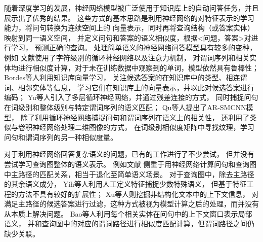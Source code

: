 随着深度学习的发展，神经网络模型被广泛使用于知识库上的自动问答任务，并且展示出了优秀的结果。
这些方式的基本思路是利用神经网络的对特征表示的学习能力，将问句转换为连续空间上的
向量表示，同时再将查询结构（或答案实体）映射到同一语义空间，
并定义问句和答案的语义相似度，根据\textless 问题，答案\textgreater 对进行学习，
预测正确的查询。
处理简单语义的神经网络问答模型具有较多的变种，
例如
文献\parencite{yin2016simple,golub2016character}使用了字符级别的循环神经网络以及注意力机制，
对谓词序列和相关实体均进行相似度计算，对于未在训练数据中观察到的单词，模型依然具有鲁棒性；
Bordes等人\cite{bordes2014open}利用知识库向量学习，
关注候选答案的在知识库中的类型、相连谓词、相邻实体等信息，
学习它们在知识库上的向量表示，并以此对候选答案进行编码；
Yu等人\cite{yu2017improved}引入了多层循环神经网络，并通过残差连接的方式，
同时捕捉问句在词级别和整体级别与特定谓词序列的语义匹配；
Qu等人\cite{qu2018question}提出了AR-SMCNN模型，
除了利用循环神经网络捕捉问句和谓词序列在语义上的相关性，
还利用了类似与卷积神经网络处理二维图像的方式，
在词级别相似度矩阵中寻找纹理，学习问句和谓词序列的另一种相似度量。


对于利用神经网络回答复杂语义的问题，已有的工作进行了不少尝试，
但并没有尝试学习查询图整体的语义表示。
例如文献\parencite{yih2015semantic,xu2016question}
侧重于用神经网络计算问句和查询图中主路径的匹配关系，相当于退化至简单语义场景。
对于查询图中，除去主路径的其余语义成分，
Yih等人\cite{yih2015semantic}利用人工定义特征捕捉少数特殊语义，
但基于特征工程的方法不具有较好的扩展性；
Xu等人\cite{xu2016question}则挖掘非结构化文本中的上下文信息，
对满足主路径的候选答案进行过滤，这种方式被视为模型计算之后的处理，而并没有从本质上解决问题。
Bao等人\cite{bao2016constraint}利用每个相关实体在问句中的上下文窗口表示局部语义，
并和查询图中的对应的谓词路径进行相似度匹配计算，但谓词路径之间仍缺少关联。


